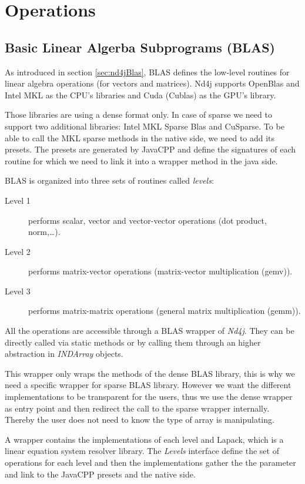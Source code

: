 \chapter{Operations}

\section{Basic Linear Algerba Subprograms (BLAS)}
As introduced in section \ref{sec:nd4jBlas}, BLAS defines the low-level routines for linear algebra operations (for vectors and matrices). Nd4j supports OpenBlas and Intel MKL as the CPU's libraries and Cuda (Cublas) as the GPU's library.

Those libraries are using a dense format only. In case of sparse we need to support two additional libraries: Intel MKL Sparse Blas and CuSparse. To be able to call the MKL sparse methods in the native side, we need to add its presets. The presets are generated by JavaCPP and define the signatures of each routine for which we need to link it into a wrapper method in the java side.

BLAS is organized into three sets of routines called \textit{levels}:
\begin{description}
	\item [Level 1] performs scalar, vector and vector-vector operations (dot product, norm,\dots).
	\item [Level 2] performs matrix-vector operations (matrix-vector multiplication (gemv)).
	\item [Level 3] performs matrix-matrix operations (general matrix multiplication (gemm)).
\end{description} 
 
 All the operations are accessible through a BLAS wrapper of \textit{Nd4j}. They can be directly called via static methods or by calling them through an higher abstraction in \textit{INDArray} objects.
 
 This wrapper only wraps the methods of the dense BLAS library, this is why we need a specific wrapper for sparse BLAS library. However we want the different implementations to be transparent for the users, thus we use the dense wrapper as entry point and then redirect the call to the sparse wrapper internally. Thereby the user does not need to know the type of array is manipulating.
 
 A wrapper contains the implementations of each level and Lapack, which is a linear equation system resolver library. The \textit{Levels} interface define the set of operations for each level and then the implementations gather the the parameter and link to the JavaCPP presets and the native side.
 
